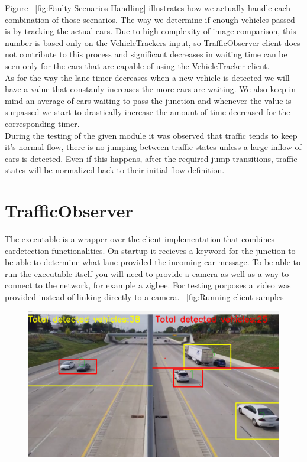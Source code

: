 \documentclass[17pt]{report}
\begin{document}
\indent
Figure ~\ref{fig:Faulty Scenarios Handling} illustrates how 
we actually handle each combination of those scenarios. The way we determine if enough vehicles passed is by 
tracking the actual cars. Due to high complexity of image 
comparison, this number is based only on the VehicleTrackers 
input, so TrafficObserver client does not contribute to this process 
and significant decreases in waiting time can be seen only for the 
cars that are capable of using the VehicleTracker client.\\
\indent
As for the way the lane timer decreases when a new vehicle is
detected we will have a value that constanly increases the more cars 
are waiting. We also keep in mind an average of cars 
waiting to pass the junction and whenever the value is surpassed 
we start to drastically increase the amount of time decreased 
for the corresponding timer.\\
\indent
During the testing of the given module it was observed that traffic tends to keep it's 
normal flow, there is no jumping between traffic states unless a large inflow of cars is 
detected. Even if this happens, after the required jump transitions, traffic states will 
be normalized back to their initial flow definition.

\pagebreak
\section{TrafficObserver}
\indent \indent
The executable is a wrapper over the client implementation that combines
cardetection functionalities. On startup it recieves a keyword for the junction to be able
to determine what lane provided the incoming car message. To be able to run 
the executable itself you will need to provide a camera as well as a way to 
connect to the network, for example a zigbee. For testing porposes a
video was provided instead of linking directly to a camera. ~\ref{fig:Running client samples}

\begin{figure}[h!]
    \includegraphics[width=\textwidth]{TrafficDetectionRunningExample.png}
    \label{fig:Running client sample}
\end{figure}
\end{document}
